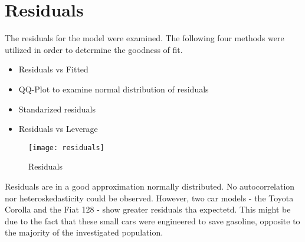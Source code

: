 \documentclass[10pt,a4paper]{article}
\begin{document}
\newpage
\section{Residuals}

The residuals for the model were examined. The following four methods were utilized in order to determine the goodness of fit.

\begin{itemize}
 \item Residuals vs Fitted
 \item QQ-Plot to examine normal distribution of residuals
 \item Standarized residuals
 \item Residuals vs Leverage
\end{itemize}

\begin{figure}
\centering
\texttt{[image: residuals]}
\caption[Residuals]{Residuals}
\end{figure}

Residuals are in a good approximation normally distributed. No autocorrelation nor heteroskedasticity could be observed.
However, two car models - the Toyota Corolla and the Fiat 128 - show greater residuals tha expectetd. This might be due to the fact that these small cars were engineered to save gasoline, opposite to the majority of the investigated population.
\end{document}
